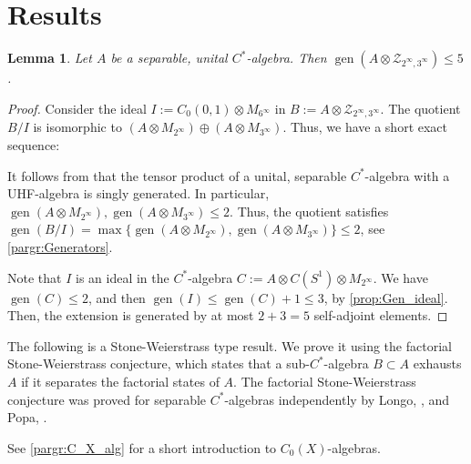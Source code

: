 \documentclass{amsart}
\newtheorem{lma}{Lemma}[section]
\theoremstyle{definition}
\begin{document}
\section{Results}
\label{sect:results}

\begin{lma}
\label{lma:Getting_5}
    Let $A$ be a separable, unital {{$C^*$-al\-ge\-bra}}{}.
    Then $\operatorname{gen}(A\otimes \mathcal{Z}_{2^\infty,3^\infty})\leq 5$.
\end{lma}
\begin{proof}
    Consider the ideal $I:=C_0(0,1)\otimes M_{6^\infty}$ in $B:=A\otimes \mathcal{Z}_{2^\infty,3^\infty}$.
    The quotient $B/I$ is isomorphic to $(A\otimes M_{2^\infty})\oplus (A\otimes M_{3^\infty})$.
    Thus, we have a short exact sequence:
    \begin{center}
    \end{center}

    It follows from \cite{OlsZam1976} that the tensor product of a unital, separable {{$C^*$-al\-ge\-bra}}{} with a UHF-algebra is singly generated.
    In particular, $\operatorname{gen}(A\otimes M_{2^\infty}),\operatorname{gen}(A\otimes M_{3^\infty})\leq 2$.
    Thus, the quotient satisfies $\operatorname{gen}(B/I)=\max\{\operatorname{gen}(A\otimes M_{2^\infty}),\operatorname{gen}(A\otimes M_{3^\infty})\}\leq 2$, see \ref{pargr:Generators}.

    Note that $I$ is an ideal in the {{$C^*$-al\-ge\-bra}}{} $C:=A\otimes C(S^1)\otimes M_{2^\infty}$.
    We have $\operatorname{gen}(C)\leq 2$, and then $\operatorname{gen}(I)\leq\operatorname{gen}(C)+1\leq 3$, by \autoref{prop:Gen_ideal}.
    Then, the extension is generated by at most $2+3=5$ self-adjoint elements.
\end{proof}

\noindent
    The following is a Stone-Weierstrass type result.
    We prove it using the factorial Stone-Weierstrass conjecture, which states that a sub-{{$C^*$-al\-ge\-bra}}{} $B\subset A$ exhausts $A$ if it separates the factorial states of $A$.
    The factorial Stone-Weierstrass conjecture was proved for separable {{$C^*$-al\-ge\-bra}}{s} independently by Longo, \cite{Lon1984}, and Popa, \cite{Pop1984}.

    See \ref{pargr:C_X_alg} for a short introduction to $C_{0}(X)$-algebras.
\end{document}
